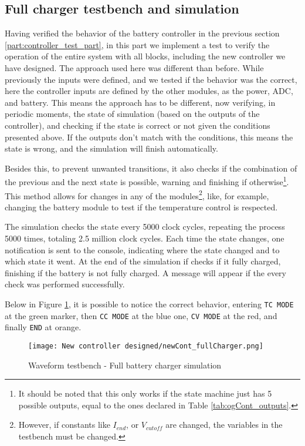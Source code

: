 \documentclass[12pt]{article}
\begin{document}
\subsection{Full charger testbench and simulation}
Having verified the behavior of the battery controller in the previous section \ref{part:controller_test_part}, in this part we implement a test to verify the operation of the entire system with all blocks, including the new controller we have designed. The approach used here was different than before. While previously the inputs were defined, and we tested if the behavior was the correct, here the controller inputs are defined by the other modules, as the power, ADC, and battery. This means the approach has to be different, now verifying, in periodic moments, the state of simulation (based on the outputs of the controller), and checking if the state is correct or not given the conditions presented above. If the outputs don't match with the conditions, this means the state is wrong, and the simulation will finish automatically. 

Besides this, to prevent unwanted transitions, it also checks if the combination of the previous and the next state is possible, warning and finishing if otherwise\footnote{It should be noted that this only works if the state machine just has 5 possible outputs, equal to the ones declared in Table \ref{tab:ogCont_outputs}.}. This method allows for changes in any of the modules\footnote{However, if constants like $I_{end}$, or $V_{cutoff}$ are changed, the variables in the testbench must be changed.}, like, for example, changing the battery module to test if the temperature control is respected.

The simulation checks the state every 5000 clock cycles, repeating the process 5000 times, totaling 2.5 million clock cycles. Each time the state changes, one notification is sent to the console, indicating where the state changed and to which state it went. At the end of the simulation if checks if it fully charged, finishing if the battery is not fully charged. A message will appear if the every check was performed successfully.

Below in Figure \ref{fig:full_battery_waveform}, it is possible to notice the correct behavior, entering \texttt{TC MODE} at the green marker, then \texttt{CC MODE} at the blue one, \texttt{CV MODE} at the red, and finally \texttt{END} at orange.

\begin{figure}[H]
    \centering
    \texttt{[image: New controller designed/newCont\_fullCharger.png]}
    \caption{Waveform testbench - Full battery charger simulation}
    \label{fig:full_battery_waveform}
\end{figure}
\end{document}

